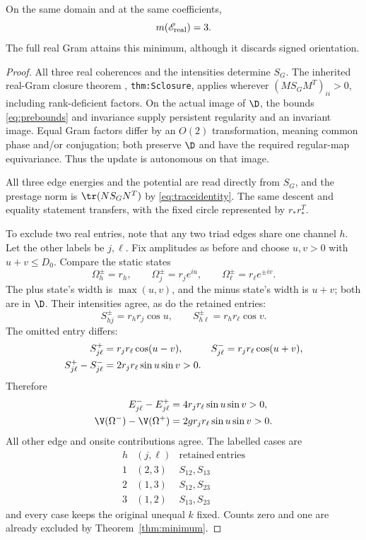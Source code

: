 \begin{theorem}\label{thm:realminimum}
On the same domain and at the same coefficients,
\[
m(\mathscr E_{\rm real})=3.
\]
The full real Gram attains this minimum, although it discards signed orientation.
\end{theorem}
\begin{proof}
All three real coherences and the intensities determine \(S_G\). The inherited real-Gram closure theorem \cite{nrg}, \texttt{thm:Sclosure}, applies wherever \((MS_GM^T)_{ii}>0\), including rank-deficient factors. On the actual image of \(\D\), the bounds \eqref{eq:prebounds} and invariance supply persistent regularity and an invariant image. Equal Gram factors differ by an \(O(2)\) transformation, meaning common phase and/or conjugation; both preserve \(\D\) and have the required regular-map equivariance. Thus the update is autonomous on that image.

All three edge energies and the potential are read directly from \(S_G\), and the prestage norm is \(\tr(NS_GN^T)\) by \eqref{eq:traceidentity}. The same descent and equality statement transfers, with the fixed circle represented by \(r_*r_*^T\).

To exclude two real entries, note that any two triad edges share one channel \(h\). Let the other labels be \(j,\ell\). Fix amplitudes as before and choose \(u,v>0\) with \(u+v\le D_0\). Compare the static states
\begin{equation}
\Omega_h^\pm=r_h,\qquad
\Omega_j^\pm=r_j e^{iu},\qquad
\Omega_\ell^\pm=r_\ell e^{\pm iv}.
\label{eq:realwitness}
\end{equation}
The plus state's width is \(\max(u,v)\), and the minus state's width is \(u+v\); both are in \(\D\). Their intensities agree, as do the retained entries:
\[
S_{hj}^\pm=r_hr_j\cos u,\qquad
S_{h\ell}^\pm=r_hr_\ell\cos v.
\]
The omitted entry differs:
\begin{align}
S_{j\ell}^+&=r_jr_\ell\cos(u-v),&
S_{j\ell}^-&=r_jr_\ell\cos(u+v),\notag\\
S_{j\ell}^+-S_{j\ell}^-&=2r_jr_\ell\sin u\sin v>0.&&
\label{eq:missingreal}
\end{align}
Therefore
\begin{align}
E_{j\ell}^- -E_{j\ell}^+&=4r_jr_\ell\sin u\sin v>0,\notag\\
\V(\Omega^-)-\V(\Omega^+)&=2g r_jr_\ell\sin u\sin v>0.
\label{eq:realobstruction}
\end{align}
All other edge and onsite contributions agree. The labelled cases are
\[
\begin{array}{c|c|c}
h&(j,\ell)&\mathrm{retained\ entries}\\ \hline
1&(2,3)&S_{12},S_{13}\\
2&(1,3)&S_{12},S_{23}\\
3&(1,2)&S_{13},S_{23}
\end{array}
\]
and every case keeps the original unequal \(k\) fixed. Counts zero and one are already excluded by Theorem~\ref{thm:minimum}.
\end{proof}

